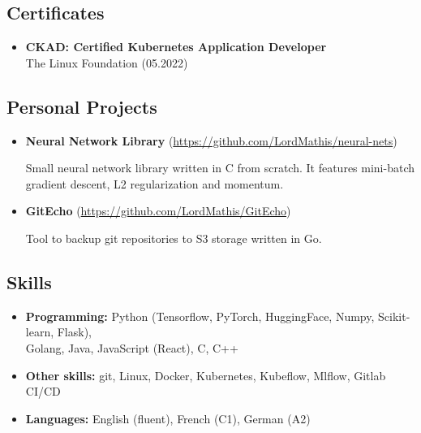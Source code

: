 \documentclass[a4paper,12pt]{article}
\begin{document}
{\color{myblue}
\subsection*{Certificates}\label{certificates}
}
\begin{itemize}
    \item   
    \textbf{CKAD: Certified Kubernetes Application Developer}\\
     The Linux Foundation \hfill (05.2022)
\end{itemize}

{\color{myblue}
\subsection*{Personal Projects}\label{projects}
}
\begin{itemize}
\item
    \textbf{Neural Network Library} (\href{https://github.com/LordMathis/neural-nets}{https://github.com/LordMathis/neural-nets})

    Small neural network library written in C from scratch. It features mini-batch gradient descent, L2 regularization and momentum.

\item 
    \textbf{GitEcho} (\href{https://github.com/LordMathis/GitEcho}{https://github.com/LordMathis/GitEcho})

    Tool to backup git repositories to S3 storage written in Go.
\end{itemize}

{\color{myblue}
\subsection*{Skills}\label{skills}
}
\begin{itemize}
\setlength\itemsep{0.2em} %
\item
  \textbf{Programming:} Python (Tensorflow, PyTorch, HuggingFace, Numpy, Scikit-learn, Flask), \\ Golang, Java, JavaScript (React), C, C++
\item
  \textbf{Other skills:} git, Linux, Docker, Kubernetes, Kubeflow, Mlflow, Gitlab CI/CD
\item
  \textbf{Languages:} English (fluent), French (C1), German (A2)
\end{itemize}
\end{document}
